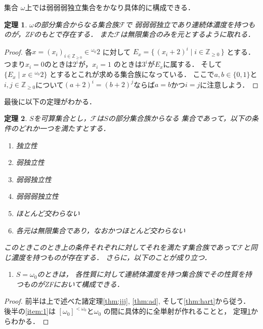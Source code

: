 \documentclass[leqno, a4paper, 12pt]{jsarticle}
\newtheorem{thm}{定理}
\newcommand{\zz}{\mathbb{Z}}
\newcommand{\myomega}{\omega_{0}}
\begin{document}
集合
$\omega$上では弱弱弱独立集合をかなり具体的に構成できる．

\begin{thm}\label{thm:omega}
$\omega$の部分集合からなる集合族$\mathcal{F}$で
弱弱弱独立であり連続体濃度を持つものが，ZFのもとで存在する．
また$\mathcal{F}$は無限集合のみを元とするように取れる．
\end{thm}
\begin{proof}
各$x=(x_{i})_{i\in \zz_{\ge 0}}\in {}^{\myomega}2$
に対して
$E_{x}=\{\, (x_{i}+2)^{i}\mid  i\in \zz_{\ge 0}\, \}$
とする．つまり$x_{i}=0$のときは$2^{i}$が，$x_{i}=1$
のときは$3^{i}$が$E_{x}$に属する．
そして$\{E_{x}\mid x\in {}^{\myomega}2\}$
とするとこれが求める集合族になっている．
ここで$a, b\in \{0, 1\}$と$i, j\in \zz_{\ge 0}$について$(a+2)^{i}=(b+2)^{j}$ならば$a=b$かつ$i=j$に注意しよう．
\end{proof}



最後に以下の定理がわかる．
\begin{thm}\label{thm:10}
$S$を可算集合とし，$\mathcal{F}$は$S$の部分集合族からなる
集合であって，以下の条件のどれか一つを満たすとする．
\begin{enumerate}[label=\textup{(\Alph*)}]
\item 独立性
\item 弱独立性
\item 弱弱独立性
\item 弱弱弱独立性
\item ほとんど交わらない
\item 各元は無限集合であり，なおかつほとんど交わらない
\end{enumerate}
このときこのとき上の条件それぞれに対してそれを満たす集合族であって$\mathcal{F}$と同じ濃度を持つものが存在する．
さらに，以下のことが成り立つ．
\begin{enumerate}[label=\textup{(\arabic*)}]
\item\label{item:1}
$S=\myomega$のときは，
各性質に対して連続体濃度を持つ集合族でその性質を持つものがZFにおいて構成できる．

\end{enumerate}
\end{thm}
\begin{proof}
前半は上で述べた諸定理\ref{thm:jjj}, 
\ref{thm:ad}, そして\ref{thm:hart}から従う．
後半の\ref{item:1}は
$[\myomega]^{<\myomega}$と$\myomega$
の間に具体的に全単射が作れることと，
定理\ref{thm:omega}からわかる．
\end{proof}
\end{document}
